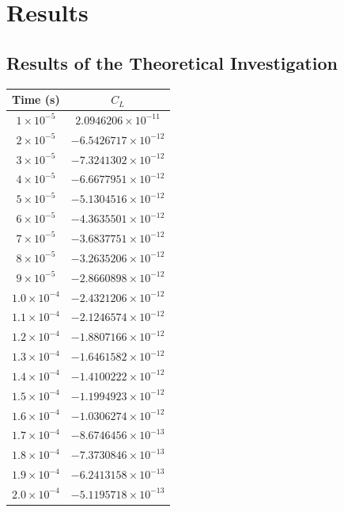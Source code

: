 \section{Results}
\subsection{Results of the Theoretical Investigation}

\begin{table}[H]
	\centering
	\renewcommand{\arraystretch}{1.3}
	\begin{tabular}{|c|c|}
		\hline
		\textbf{Time (s)} & \textbf{$C_L$} \\
		\hline
		$1 \times 10^{-5}$ & $2.0946206 \times 10^{-11}$ \\
		$2 \times 10^{-5}$ & $-6.5426717 \times 10^{-12}$ \\
		$3 \times 10^{-5}$ & $-7.3241302 \times 10^{-12}$ \\
		$4 \times 10^{-5}$ & $-6.6677951 \times 10^{-12}$ \\
		$5 \times 10^{-5}$ & $-5.1304516 \times 10^{-12}$ \\
		$6 \times 10^{-5}$ & $-4.3635501 \times 10^{-12}$ \\
		$7 \times 10^{-5}$ & $-3.6837751 \times 10^{-12}$ \\
		$8 \times 10^{-5}$ & $-3.2635206 \times 10^{-12}$ \\
		$9 \times 10^{-5}$ & $-2.8660898 \times 10^{-12}$ \\
		$1.0 \times 10^{-4}$ & $-2.4321206 \times 10^{-12}$ \\
		$1.1 \times 10^{-4}$ & $-2.1246574 \times 10^{-12}$ \\
		$1.2 \times 10^{-4}$ & $-1.8807166 \times 10^{-12}$ \\
		$1.3 \times 10^{-4}$ & $-1.6461582 \times 10^{-12}$ \\
		$1.4 \times 10^{-4}$ & $-1.4100222 \times 10^{-12}$ \\
		$1.5 \times 10^{-4}$ & $-1.1994923 \times 10^{-12}$ \\
		$1.6 \times 10^{-4}$ & $-1.0306274 \times 10^{-12}$ \\
		$1.7 \times 10^{-4}$ & $-8.6746456 \times 10^{-13}$ \\
		$1.8 \times 10^{-4}$ & $-7.3730846 \times 10^{-13}$ \\
		$1.9 \times 10^{-4}$ & $-6.2413158 \times 10^{-13}$ \\
		$2.0 \times 10^{-4}$ & $-5.1195718 \times 10^{-13}$ \\

\end{tabular}
\end{table}
